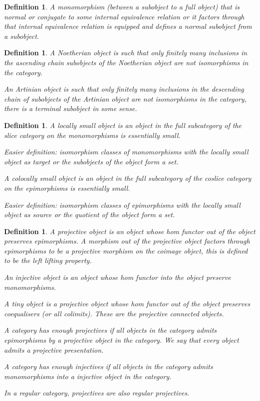 \documentclass{tufte-book}
\newtheorem{definition}[theorem]{Definition}
\begin{document}
 \begin{definition}
     A monomorphism (between a subobject to a full object) that is normal or conjugate to some internal equivalence relation or it factors through that internal equivalence relation is equipped and defines a normal subobject from a subobject.
 \end{definition}
 
 \begin{definition}
     A Noetherian object is such that only finitely many inclusions in the ascending chain subobjects of the Noetherian object are not isomorphisms in the category.
 
     An Artinian object is such that only finitely many inclusions in the descending chain of subobjects of the Artinian object are not isomorphisms in the category, there is a terminal subobject in some sense.
 \end{definition}
 
 \begin{definition}
     A locally small object is an object in the full subcategory of the slice category on the monomorphisms is essentially small.
 
     Easier definition: isomorphism classes of monomorphisms with the locally small object as target or the subobjects of the object form a set.
 
     A colocally small object is an object in the full subcategory of the coslice category on the epimorphisms is essentially small.
 
     Easier definition: isomorphism classes of epimorphisms with the locally small object as source or the quotient of the object form a set.
 \end{definition}
 
 \begin{definition}
     A projective object is an object whose hom functor out of the object preserves epimorphisms. A morphism out of the projective object factors through epimorphisms to be a projective morphism on the coimage object, this is defined to be the left lifting property.
     
     An injective object is an object whose hom functor into the object preserve monomorphisms.
 
     A tiny object is a projective object whose hom functor out of the object preserves coequalisers (or all colimits). These are the projective connected objects.
 
     A category has enough projectives if all objects in the category admits epimorphisms by a projective object in the category. We say that every object admits a projective presentation.
 
     A category has enough injectives if all objects in the category admits monomorphisms into a injective object in the category.
 
     In a regular category, projectives are also regular projectives.
 \end{definition}
 
\end{document}
